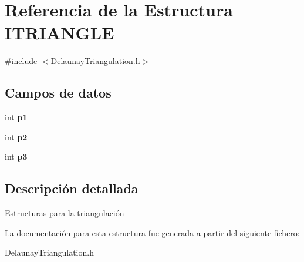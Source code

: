 \hypertarget{structITRIANGLE}{}\section{Referencia de la Estructura I\+T\+R\+I\+A\+N\+G\+L\+E}
\label{structITRIANGLE}


{\ttfamily \#include $<$Delaunay\+Triangulation.\+h$>$}

\subsection*{Campos de datos}
\begin{DoxyCompactItemize}
\item 
\hypertarget{structITRIANGLE_aa1e37637bc334917eebe0ebe876a1a7f}{}int {\bfseries p1}\label{structITRIANGLE_aa1e37637bc334917eebe0ebe876a1a7f}

\item 
\hypertarget{structITRIANGLE_a93d3170df8fd638bbefe05f86716bd98}{}int {\bfseries p2}\label{structITRIANGLE_a93d3170df8fd638bbefe05f86716bd98}

\item 
\hypertarget{structITRIANGLE_ae949f00b13e5ed72d47ee773ad4ce5b4}{}int {\bfseries p3}\label{structITRIANGLE_ae949f00b13e5ed72d47ee773ad4ce5b4}

\end{DoxyCompactItemize}


\subsection{Descripción detallada}
Estructuras para la triangulación 

La documentación para esta estructura fue generada a partir del siguiente fichero\+:\begin{DoxyCompactItemize}
\item 
Delaunay\+Triangulation.\+h\end{DoxyCompactItemize}
